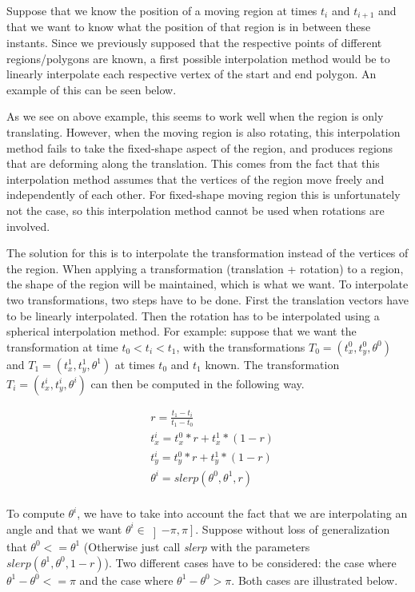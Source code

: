 		Suppose that we know the position of a moving region at times \( t_i \) and \( t_{i+1} \) and that we want to know what the position of that region is in between these instants. Since we previously supposed that the respective points of different regions/polygons are known, a first possible interpolation method would be to linearly interpolate each respective vertex of the start and end polygon. An example of this can be seen below. 

		As we see on above example, this seems to work well when the region is only translating. However, when the moving region is also rotating, this interpolation method fails to take the fixed-shape aspect of the region, and produces regions that are deforming along the translation. This comes from the fact that this interpolation method assumes that the vertices of the region move freely and independently of each other. For fixed-shape moving region this is unfortunately not the case, so this interpolation method cannot be used when rotations are involved. 

		The solution for this is to interpolate the transformation instead of the vertices of the region. When applying a transformation (translation + rotation) to a region, the shape of the region will be maintained, which is what we want. To interpolate two transformations, two steps have to be done. First the translation vectors have to be linearly interpolated. Then the rotation has to be interpolated using a spherical interpolation method. For example: suppose that we want the transformation at time \( t_0 < t_i < t_1 \), with the transformations \( T_0 = (t_x^0, t_y^0, \theta^0) \) and \( T_1 = (t_x^1, t_y^1, \theta^1) \) at times \( t_0 \) and \( t_1 \) known. The transformation \( T_i = (t_x^i, t_y^i, \theta^i) \) can then be computed in the following way.

		\begin{equation}
		\begin{split}
			& r = \frac{t_1 - t_i}{t_1 - t_0} \\
			& t_x^i = t_x^0 * r + t_x^1 * (1-r) \\
			& t_y^i = t_y^0 * r + t_y^1 * (1-r) \\	
			& \theta^i = slerp(\theta^0, \theta^1, r) \\
		\end{split}
		\end{equation}

		To compute \( \theta^i \), we have to take into account the fact that we are interpolating an angle and that we want \( \theta^i \in \left ] - \pi , \pi \right ] \). Suppose without loss of generalization that \( \theta^0 <= \theta^1 \) (Otherwise just call \textit{slerp} with the parameters \( slerp(\theta^1, \theta^0, 1-r) \)). Two different cases have to be considered: the case where \( \theta^1 - \theta^0 <= \pi \) and the case where \( \theta^1 - \theta^0 > \pi \). Both cases are illustrated below.
		
